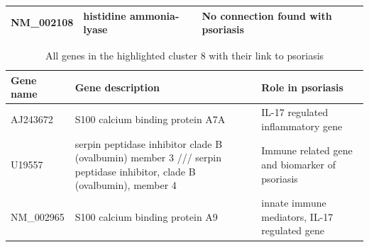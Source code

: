 \documentclass[10pt,a4paper]{article}
\begin{document}
\begin{table}[]
\begin{tabular}{l|p{4.5cm} p{8.5cm}}
		NM\_002108         & histidine ammonia-lyase                                                                                                 & No connection found with psoriasis                                                                                                                                                                                                                                          \\ \hline                                                                                                                                                                                                                                        
	\end{tabular}
\end{table}
	
	\begin{table}[]
		\centering
		\caption{All genes in the highlighted cluster 8 with their link to psoriasis}
		\label{tab:GenesCluster8}
		\begin{tabular}{l|p{5cm} p{8cm}}
			\textbf{Gene name} & \textbf{Gene description}                                                                                               & \textbf{Role in psoriasis}                                                                                                                                                                                                                \\ \hline
			AJ243672           & S100 calcium binding protein A7A                                                                                        & IL-17 regulated inflammatory gene\cite{chiricozzi2011integrative}                                                                                                                                                                                                         \\
			U19557             & serpin peptidase inhibitor clade B (ovalbumin)  member 3 /// serpin peptidase inhibitor,  clade B (ovalbumin), member 4 & Immune related gene and biomarker of psoriasis\cite{lowes2008psoriasis, jiang2015biomarkers}                                                                                                                                                                                            \\
			NM\_002965         & S100 calcium binding protein A9                                                                                         & innate immune mediators, IL-17 regulated gene\cite{chiricozzi2011integrative}                                                                                                                                                                                              \\

\end{tabular}
\end{table}
\end{document}
